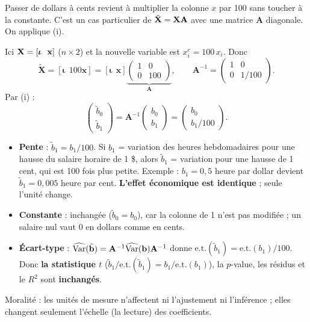 \documentclass[11pt,a4paper]{article}
\newcommand{\A}{\mathbf{A}}\newcommand{\I}{\mathbf{I}}
\newcommand{\tX}{\tilde{\mathbf{X}}}
\begin{document}
\begin{idee}
Passer de dollars à cents revient à multiplier la colonne $x$ par 100 sans toucher à la constante. C'est un cas particulier de $\tX=\vX\A$ avec une matrice $\A$ diagonale. On applique (i).
\end{idee}

Ici $\mathbf{X}=[\bm\iota\ \ \mathbf x]$ ($n\times 2$) et la nouvelle variable est $x_i^{c}=100\,x_i$. Donc
\[
\tX=[\bm\iota\ \ 100\mathbf x]=[\bm\iota\ \ \mathbf x]\underbrace{\begin{pmatrix}1&0\\0&100\end{pmatrix}}_{\A},
\qquad
\A^{-1}=\begin{pmatrix}1&0\\0&1/100\end{pmatrix}.
\]
Par (i) :
\[
\begin{pmatrix}\tilde b_0\\ \tilde b_1\end{pmatrix}=\A^{-1}\begin{pmatrix}b_0\\ b_1\end{pmatrix}=\begin{pmatrix}b_0\\ b_1/100\end{pmatrix}.
\]

\begin{reponse}
\begin{itemize}[nosep]
\item \textbf{Pente} : $\tilde b_1=b_1/100$. Si $b_1$ = variation des heures hebdomadaires pour une hausse du salaire horaire de 1 \$, alors $\tilde b_1$ = variation pour une hausse de 1 cent, qui est 100 fois plus petite. Exemple : $b_1=0{,}5$ heure par dollar devient $\tilde b_1=0{,}005$ heure par cent. \textbf{L'effet économique est identique} ; seule l'unité change.
\item \textbf{Constante} : inchangée ($\tilde b_0=b_0$), car la colonne de 1 n'est pas modifiée ; un salaire nul vaut 0 en dollars comme en cents.
\item \textbf{Écart-type} : $\widehat{\Var}(\tilde{\vb})=\A^{-1}\widehat{\Var}(\vb)\A^{-1}$ donne $\text{e.t.}(\tilde b_1)=\text{e.t.}(b_1)/100$. Donc \textbf{la statistique $t$} ($\tilde b_1/\text{e.t.}(\tilde b_1)=b_1/\text{e.t.}(b_1)$), la $p$-value, les résidus et le $R^2$ sont \textbf{inchangés}.
\end{itemize}
Moralité : les unités de mesure n'affectent ni l'ajustement ni l'inférence ; elles changent seulement l'échelle (la lecture) des coefficients.
\end{reponse}
\end{document}
